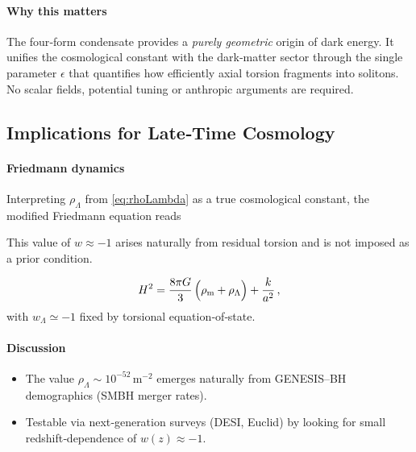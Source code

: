 \documentclass{article}
\begin{document}
\paragraph{Why this matters}
The four‑form condensate provides a \emph{purely geometric} origin of dark
energy.  It unifies the cosmological constant with the dark‑matter sector
through the single parameter \(\epsilon\) that quantifies how efficiently axial
torsion fragments into solitons.  No scalar fields, potential tuning or
anthropic arguments are required.

\medskip
\begin{center}
\end{center}





\subsection{Implications for Late‐Time Cosmology}
\label{sec:late-cosmo}
\paragraph{Friedmann dynamics}
Interpreting $\rho_\Lambda$ from \eqref{eq:rhoLambda} as a true cosmological constant, the modified Friedmann equation reads

This value of \(w \approx -1\) arises naturally from residual torsion and is not imposed as a prior condition.


\[
  H^2
  = \frac{8\pi G}{3}\,\Bigl(\rho_{\rm m} + \rho_\Lambda\Bigr)
  + \frac{k}{a^2}\,,
\]
with $w_\Lambda\simeq-1$ fixed by torsional equation‐of‐state.

\paragraph{Discussion}
\begin{itemize}
  \item The value $\rho_\Lambda\sim10^{-52}\,\mathrm m^{-2}$ emerges naturally from GENESIS–BH demographics (SMBH merger rates).  
  \item Testable via next‐generation surveys (DESI, Euclid) by looking for small redshift‐dependence of $w(z)\approx-1$.  
\end{itemize}
\end{document}
